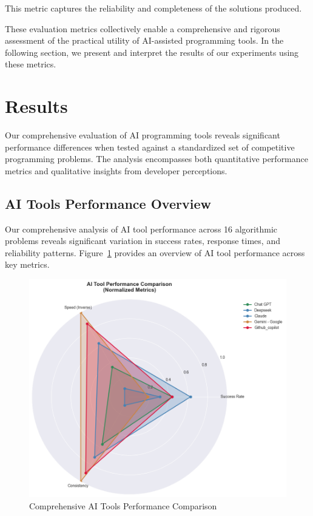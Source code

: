 \documentclass[conference]{IEEEtran}
\begin{document}
This metric captures the reliability and completeness of the solutions produced.











These evaluation metrics collectively enable a comprehensive and rigorous assessment of the practical utility of AI-assisted programming tools. In the following section, we present and interpret the results of our experiments using these metrics.


\section{Results}

Our comprehensive evaluation of AI programming tools reveals significant performance differences when tested against a standardized set of competitive programming problems. The analysis encompasses both quantitative performance metrics and qualitative insights from developer perceptions.

\subsection{AI Tools Performance Overview}

Our comprehensive analysis of AI tool performance across 16 algorithmic problems reveals significant variation in success rates, response times, and reliability patterns. Figure~\ref{fig:performance_comparison} provides an overview of AI tool performance across key metrics.

\begin{figure}[htbp]
\centering
\includegraphics[width=0.85\linewidth]{images/ai_tools_images_updated/ai_rools_performance_comparason.png}
\caption{Comprehensive AI Tools Performance Comparison}
\label{fig:performance_comparison}
\end{figure}
\end{document}
